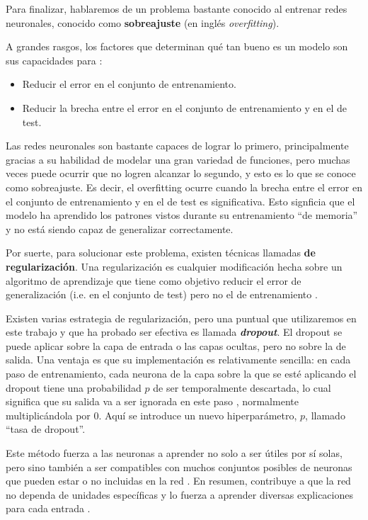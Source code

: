 \documentclass[../../main.tex]{subfiles}
\begin{document}
\bigskip
Para finalizar, hablaremos de un problema bastante conocido al entrenar redes neuronales,
conocido como \textbf{sobreajuste} (en inglés \textit{overfitting}).

A grandes rasgos, los factores que determinan qué tan bueno es un modelo son sus capacidades
para \cite{deep-learning}:
\begin{itemize}[itemsep=0.1cm]
    \item Reducir el error en el conjunto de entrenamiento.
    \item Reducir la brecha entre el error en el conjunto de entrenamiento y en el de
    test.
\end{itemize}

Las redes neuronales son bastante capaces de lograr lo primero, principalmente gracias a
su habilidad de modelar una gran variedad de funciones, pero muchas veces puede ocurrir
que no logren alcanzar lo segundo, y esto es lo que se conoce como sobreajuste. Es decir,
el overfitting ocurre cuando la brecha entre el error en el conjunto de entrenamiento y en
el de test es significativa. Esto signficia que el modelo ha aprendido los patrones vistos
durante su entrenamiento ``de memoria'' y no está siendo capaz de generalizar correctamente.

Por suerte, para solucionar este problema, existen técnicas llamadas \textbf{de
regularización}. Una regularización es cualquier modificación hecha sobre un algoritmo de
aprendizaje que tiene como objetivo reducir el error de generalización (i.e. en el
conjunto de test) pero no el de entrenamiento \cite{deep-learning}.

Existen varias estrategia de regularización, pero una puntual que utilizaremos en este
trabajo y que ha probado ser efectiva es llamada \textbf{\textit{dropout}}. El dropout se
puede aplicar sobre la capa de entrada o las capas ocultas, pero no sobre la de salida.
Una ventaja es que su implementación es relativamente sencilla: en cada paso de
entrenamiento\footnotemark, cada neurona de la capa sobre la que se esté aplicando el
dropout tiene una probabilidad \(p\) de ser temporalmente descartada, lo cual significa
que su salida va a ser ignorada en este paso \cite{hands-on-ML-sklearn-tf}, normalmente
multiplicándola por 0. Aquí se introduce un nuevo hiperparámetro, \(p\), llamado ``tasa de
dropout''.

Este método fuerza a las neuronas a aprender no solo a ser útiles por sí solas,
pero sino también a ser compatibles con muchos conjuntos posibles de neuronas que pueden
estar o no incluidas en la red \cite{ai-a-modern-approach}. En resumen, contribuye
a que la red no dependa de unidades específicas y lo fuerza a aprender diversas
explicaciones para cada entrada \cite{ai-a-modern-approach}.
\end{document}
